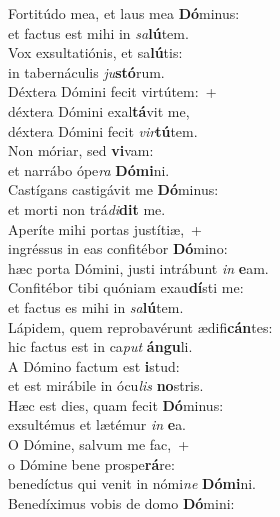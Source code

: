 \evenverse Fortitúdo mea, et laus mea \textbf{Dó}minus:~\*\\
\evenverse et factus est mihi in \textit{sa}\textbf{lú}tem.\\
\oddverse Vox exsultatiónis, et sa\textbf{lú}tis:~\*\\
\oddverse in tabernáculis \textit{ju}\textbf{stó}rum.\\
\evenverse Déxtera Dómini fecit virtútem:~+\\
\evenverse  déxtera Dómini exal\textbf{tá}vit me,~\*\\
\evenverse déxtera Dómini fecit \textit{vir}\textbf{tú}tem.\\
\oddverse Non móriar, sed \textbf{vi}vam:~\*\\
\oddverse et narrábo ópe\textit{ra} \textbf{Dó}\textbf{mi}ni.\\
\evenverse Castígans castigávit me \textbf{Dó}minus:~\*\\
\evenverse et morti non trá\textit{di}\textbf{dit} me.\\
\oddverse Aperíte mihi portas justítiæ,~+\\
\oddverse  ingréssus in eas confitébor \textbf{Dó}mino:~\*\\
\oddverse hæc porta Dómini, justi intrábunt \textit{in} \textbf{e}am.\\
\evenverse Confitébor tibi quóniam exau\textbf{dí}sti me:~\*\\
\evenverse et factus es mihi in \textit{sa}\textbf{lú}tem.\\
\oddverse Lápidem, quem reprobavérunt ædifi\textbf{cán}tes:~\*\\
\oddverse hic factus est in ca\textit{put} \textbf{án}\textbf{gu}li.\\
\evenverse A Dómino factum est \textbf{i}stud:~\*\\
\evenverse et est mirábile in ócu\textit{lis} \textbf{no}stris.\\
\oddverse Hæc est dies, quam fecit \textbf{Dó}minus:~\*\\
\oddverse exsultémus et lætémur \textit{in} \textbf{e}a.\\
\evenverse O Dómine, salvum me fac,~+\\
\evenverse  o Dómine bene prospe\textbf{rá}re:~\*\\
\evenverse benedíctus qui venit in nómi\textit{ne} \textbf{Dó}\textbf{mi}ni.\\
\oddverse Benedíximus vobis de domo \textbf{Dó}mini:~\*\\
